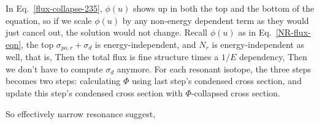 \documentclass{school-22.211-notes}
\begin{document}
\begin{enumerate}
In Eq.~\ref{flux-collapse-235}, $\phi(u)$ shows up in both the top and the bottom of the equation, so if we scale $\phi(u)$ by any non-energy dependent term as they would just cancel out, the solution would not change. Recall $\phi(u)$ as in Eq.~\ref{NR-flux-eqn}, the top $\sigma_{po,r} + \sigma_d$ is energy-independent, and $N_r$ is energy-independent as well, that is, 
Then the total flux is fine structure times a $1/E$ dependency, 
Then we don't have to compute $\sigma_d$ anymore. For each resonant isotope, the three steps becomes two steps: calculating $\Phi$ using last step's condensed cross section, and update this step's condensed cross section with $\Phi$-collapsed cross section. 

So effectively narrow resonance suggest, 

\end{enumerate}
\end{document}

